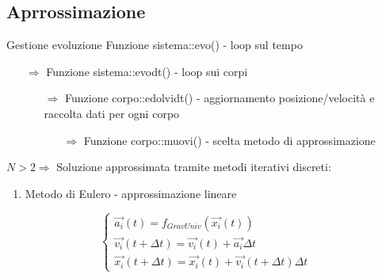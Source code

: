     \subsection[Approx]{Aprrossimazione}
        
        \begin{frame}{Gestione evoluzione}
            Funzione sistema::evo() - loop sul tempo
            \begin{itemize}
                \item[$\Rightarrow$] Funzione sistema::evodt() - loop sui corpi
                \begin{itemize}
                    \item[$\Rightarrow$] Funzione corpo::edolvidt() - aggiornamento posizione/velocità e raccolta dati per ogni corpo
                    \begin{itemize}
                        \item[$\Rightarrow$] Funzione corpo::muovi() - scelta metodo di approssimazione
                    \end{itemize}
                \end{itemize}
            \end{itemize}    

            \begin{exampleblock}{$N>2 \Rightarrow$ Soluzione approssimata tramite metodi iterativi discreti:}
                \begin{enumerate}
                    \item Metodo di Eulero - approssimazione lineare
                \end{enumerate}
                \begin{equation}
                \left\{ 
                \begin{array}{l}
                    \vec{a_i}(t)=f_{GravUniv}(\vec{x_i}(t)) \\
                    \vec{v_i}(t+\Delta t)=\vec{v_i}(t)+\vec{a_i}\Delta t \\
                    \vec{x_i}(t+\Delta t)=\vec{x_i}(t)+\vec{v_i}(t+\Delta t)\Delta t
                \end{array}
                \right.
                \end{equation}
            \end{exampleblock}
        \end{frame}

